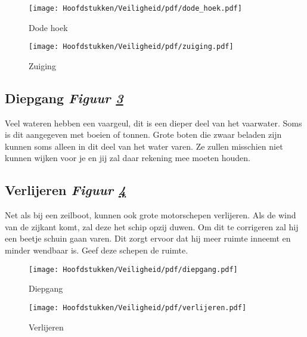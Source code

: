   \begin{center}
  \begin{minipage}[b]{0.32\textwidth}
    \begin{figure}[H]
 		\texttt{[image: Hoofdstukken/Veiligheid/pdf/dode\_hoek.pdf]}
        \caption{Dode hoek}
        \label{pic:dodehoek}
    \end{figure}
  \end{minipage}
    \hspace{2cm}
  \begin{minipage}[b]{0.32\textwidth}
  \begin{figure}[H]
 		\texttt{[image: Hoofdstukken/Veiligheid/pdf/zuiging.pdf]}
        \caption{Zuiging}
        \label{pic:zuiging}
    \end{figure}
  \end{minipage}
  \end{center}


\subsection{Diepgang  \hfill \textit{Figuur \ref{pic:diepgang}}}
Veel wateren hebben een vaargeul, dit is een dieper deel van het vaarwater. Soms is dit aangegeven met boeien of tonnen. Grote boten die zwaar beladen zijn kunnen soms alleen in dit deel van het water varen. Ze zullen misschien niet kunnen wijken voor je en jij zal daar rekening mee moeten houden.

\subsection{Verlijeren  \hfill \textit{Figuur \ref{pic:verlijeren}}}
Net als bij een zeilboot, kunnen ook grote motorschepen verlijeren. Als de wind van de zijkant komt, zal deze het schip opzij duwen. Om dit te corrigeren zal hij een beetje schuin gaan varen. Dit zorgt ervoor dat hij meer ruimte inneemt en minder wendbaar is. Geef deze schepen de ruimte. 

  \begin{center}
  \begin{minipage}[b]{0.30\textwidth}
    \begin{figure}[H]
        \texttt{[image: Hoofdstukken/Veiligheid/pdf/diepgang.pdf]}
        \caption{Diepgang}
        \label{pic:diepgang}
    \end{figure}
  \end{minipage}
    \hspace{2cm}
  \begin{minipage}[b]{0.25\textwidth}
  \begin{figure}[H]
        \texttt{[image: Hoofdstukken/Veiligheid/pdf/verlijeren.pdf]}
        \caption{Verlijeren}
        \label{pic:verlijeren}
    \end{figure}
  \end{minipage}
  \end{center}


